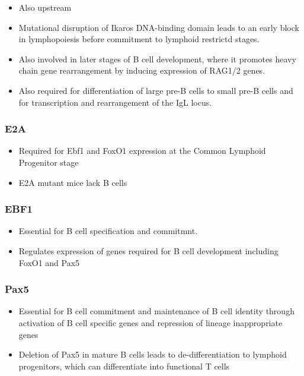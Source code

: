 \documentclass[12pt]{article}
\begin{document}
	\begin{itemize}
		\item Also upstream
		\item Mutational disruption of Ikaros DNA-binding domain leads to an early block in lymphopoiesis before commitment to lymphoid restrictd stages.
		\item Also involved in later stages of B cell development, where it promotes heavy chain gene rearrangement by inducing expression of RAG1/2 genes.
		\item Also required for differentiation of large pre-B cells to small pre-B cells and for transcription and rearrangement of the IgL locus.
	\end{itemize}
	
	\subsubsection{E2A}
	
	\begin{itemize}
		\item Required for Ebf1 and FoxO1 expression at the Common Lymphoid Progenitor stage
		\item E2A mutant mice lack B cells
	\end{itemize}
	
	\subsubsection{EBF1}
	
	\begin{itemize}
		\item Essential for B cell specification and commitmnt. 
		\item Regulates expression of genes required for B cell development including FoxO1 and Pax5
	\end{itemize}	
	
	\subsubsection{Pax5}
	
	\begin{itemize}
		\item Essential for B cell commitment and maintenance of B cell identity through activation of B cell specific genes and repression of lineage inappropriate genes
		\item Deletion of Pax5 in mature B cells leads to de-differentiation to lymphoid progenitors, which can differentiate into functional T cells
	\end{itemize}
	
\end{document}
